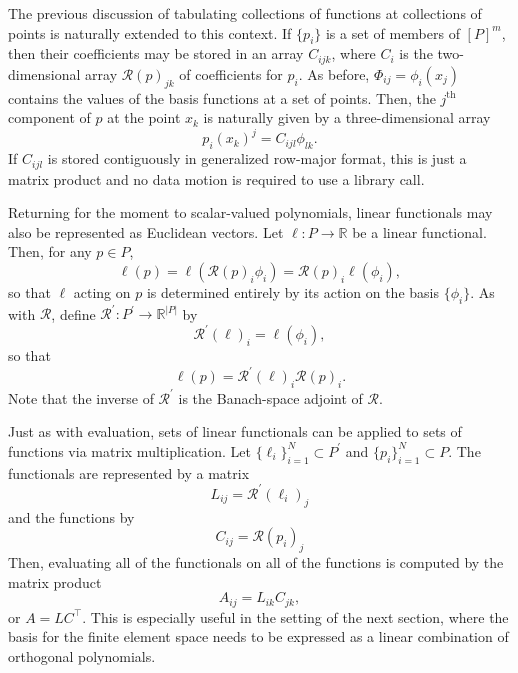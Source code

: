 The previous discussion of tabulating collections of functions at
collections of points is naturally extended to this context.  If \( \{ p_i
\} \) is a set of members of \( [P]^m \), then their coefficients may be
stored in an array \( C_{ijk} \), where \( C_i \) is the two-dimensional
array \( \mathcal{R}(p)_{jk} \) of coefficients for \( p_i \).  As before,
\( \Phi_{ij} = \phi_i(x_j) \) contains the values of the basis functions at a set
of points.  Then, the \( j^\mathrm{th} \) component of \( p \) at the
point \( x_k \) is naturally given by a three-dimensional array
\[
p_i(x_k)^j = C_{ijl} \phi_{lk}.
\]
If \( C_{ijl} \) is stored contiguously in generalized row-major format,
this is just a matrix product and no data motion is required to
use a library call.

Returning for the moment to scalar-valued polynomials, linear functionals
may also be represented as Euclidean vectors.  Let \( \ell: P \rightarrow
\mathbb{R} \) be a linear functional.  Then, for any \( p \in P \),
\[
\ell( p ) = \ell( \mathcal{R}(p)_i \phi_i )
= \mathcal{R}(p)_i \ell( \phi_i ),
\]
so that \( \ell \) acting on \( p \) is determined entirely by its
action on the basis \( \{ \phi_i \} \).  As with \( \mathcal{R} \), define
\( \mathcal{R}^\prime : P^\prime \rightarrow \mathbb{R}^{|P|} \) by
\[
  \mathcal{R}^\prime (\ell)_i
= \ell( \phi_i),
\]
so that
\[
\ell(p) = \mathcal{R}^\prime(\ell)_i\mathcal{R}(p)_i.
\]
Note that the inverse of \( \mathcal{R}^\prime \) is the Banach-space
adjoint of \( \mathcal{R} \).

Just as with evaluation, sets of linear functionals can be applied
to sets of functions via matrix multiplication.  Let \( \{ \ell_i
\}_{i=1}^N \subset P^\prime \) and \( \{ p_i \}_{i=1}^N \subset P \).
The functionals are represented by a matrix
\[
L_{ij} = \mathcal{R}^\prime(\ell_i)_j
\]
and the functions by
\[
C_{ij} = \mathcal{R}(p_i)_j
\]
Then, evaluating all of the functionals on all of the functions is
computed by the matrix product
\begin{equation}
A_{ij} = L_{ik}C_{jk},
\end{equation}
or \( A = L C^{\top} \).  This is especially useful in the setting of the
next section, where the basis for the finite element space needs to be
expressed as a linear combination of orthogonal polynomials.

